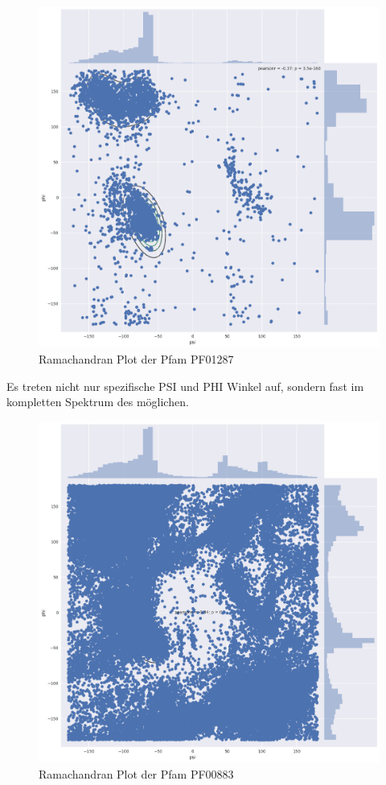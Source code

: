 
\begin{figure}
    \centering
    \includegraphics[width=.99\textwidth]{images/ramachandranplot_PF01287.png}
    \caption{Ramachandran Plot der Pfam PF01287}
    \label{fig:ramachandran_PF01287}
\end{figure}


Es treten nicht nur spezifische PSI und PHI Winkel auf, sondern fast im kompletten Spektrum des möglichen.

\begin{figure}
    \centering
    \includegraphics[width=.99\textwidth]{images/ramachandranplot_PF00883.png}
    \caption{Ramachandran Plot der Pfam PF00883}
    \label{fig:ramachandran_PF00883}
\end{figure}





